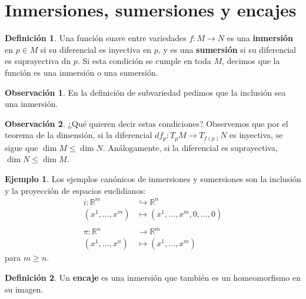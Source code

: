 \documentclass[spanish]{book}
\theoremstyle{definition}
\newtheorem*{defn}{Definición}
\newtheorem*{obs}{Observación}
\newtheorem*{ejem}{Ejemplo}
\newcommand{\R}{\mathbb{R}}
\begin{document}
\section{Inmersiones, sumersiones y encajes}
\begin{defn}
	Una función suave entre variedades $f:M\to N$ es una \textbf{inmersión} en $p\in M$ si su diferencial es inyectiva en $p$, y es una \textbf{sumersión} si su diferencial es suprayectiva dn $p$. Si esta condición se cumple en toda $M$, decimos que la función es una inmersión o una sumersión.
\end{defn}
\begin{obs}
	En la definición de subvariedad pedimos que la inclusión sea una inmersión.
\end{obs}
\begin{obs}
	¿Qué quieren decir estas condiciones? Observemos que por el teorema de la dimensión, si la diferencial $df_p:T_pM\to T_{f(p)}N$ es inyectiva, se sigue que $\dim M\leq\dim N$. Análogamente, si la diferencial es suprayectiva, $\dim N\leq\dim M$.
\end{obs}
\begin{ejem}
	Los ejemplos canónicos de inmersiones y sumersiones son la inclusión y la proyección de espacios euclidianos:
	\begin{align*}
		i:\R^m&\hookrightarrow\R^n\\
		(x^1,\ldots,x^m)&\mapsto(x^1,\ldots,x^m,0,\ldots,0)
		\\\\
		\pi:\R^n&\to\R^m\\
		(x^1,\ldots,x^n)&\mapsto(x^1,\ldots,x^m)
	\end{align*}
	para $m\geq n$.
\end{ejem}
\begin{defn}
	Un \textbf{encaje} es una inmersión que también es un homeomorfismo en su imagen.
\end{defn}
\end{document}
